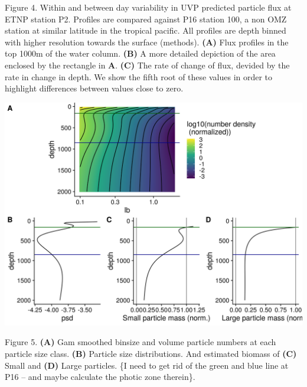\documentclass[]{article}
\begin{document}
Figure 4. Within and between day variability in UVP predicted particle
flux at ETNP station P2. Profiles are compared against P16 station 100,
a non OMZ station at similar latitude in the tropical pacific. All
profiles are depth binned with higher resolution towards the surface
(methods). \textbf{(A)} Flux profiles in the top 1000m of the water
column. \textbf{(B)} A more detailed depiction of the area enclosed by
the rectangle in \textbf{A}. \textbf{(C)} The rate of change of flux,
devided by the rate in change in depth. We show the fifth root of these
values in order to highlight differences between values close to zero.

\includegraphics{../figures/WBModelValidation.png}

Figure 5. \textbf{(A)} Gam smoothed binsize and volume particle numbers
at each particle size class. \textbf{(B)} Particle size distributions.
And estimated biomass of \textbf{(C)} Small and \textbf{(D)} Large
particles. \{I need to get rid of the green and blue line at P16 -- and
maybe calculate the photic zone therein\}.
\end{document}
